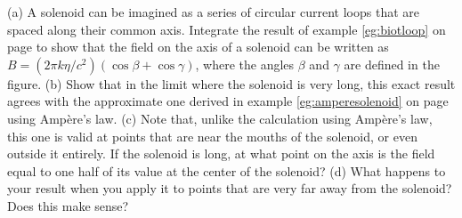 (a) A solenoid can be imagined as a series of circular current loops that are spaced
        along their common axis.
        Integrate the result of example \ref{eg:biotloop} on page
        \pageref{eg:biotloop} to show that the field
        on the axis of a solenoid can be written as
        $B=(2\pi k\eta/c^2)(\cos\beta+\cos\gamma)$, where the angles $\beta$ and
        $\gamma$ are defined in the figure.\hwendpart
        (b) Show that in the limit where the solenoid is very long, this exact result
        agrees with the approximate one derived in example
        \ref{eg:amperesolenoid} on page \pageref{eg:amperesolenoid} using Amp\`{e}re's
        law.\hwendpart
        (c) Note that, unlike the calculation using Amp\`{e}re's law, this one is valid
        at points that are near the mouths of the solenoid, or even outside it entirely.
        If the solenoid is long, at what point on the axis is the field equal to one
        half of its value at the center of the solenoid?\hwendpart
        (d) What happens to your result when you apply it to points that are very far away
        from the solenoid? Does this make sense?
